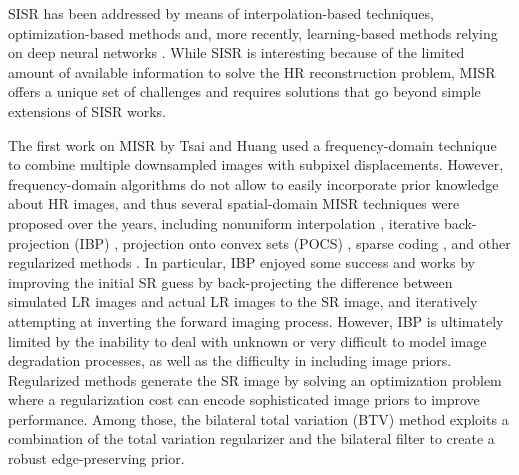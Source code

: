 \documentclass[journal]{IEEEtran}
\begin{document}
SISR has been addressed by means of interpolation-based techniques, optimization-based methods \cite{ng2007total,6414620,6241428,Zhang2013SingleIS} and, more recently, learning-based methods relying on deep neural networks \cite{DnCnnZhang, liu2018non,10.1007/978-3-319-10593-2_13,kim2016deep,kim2015deep_rec,Shi2016RealTimeSI,Lim2017EnhancedDR,Zhang2018ResidualDN}. While SISR is interesting because of the limited amount of available information to solve the HR reconstruction problem, MISR offers a unique set of challenges and requires solutions that go beyond simple extensions of SISR works. 

The first work on MISR by Tsai and Huang \cite{tsaiHuang1984} used a frequency-domain technique to combine multiple downsampled images with subpixel displacements. However, frequency-domain algorithms do not allow to easily incorporate prior knowledge about HR images, and thus several spatial-domain MISR techniques were proposed over the years, including nonuniform interpolation \cite{1176931}, iterative back-projection (IBP) \cite{IRANI1991231}, projection onto convex sets (POCS) \cite{Stark:89,413332}, sparse coding \cite{Kato:2017:DSM:3066426.3066466, KATO201564}, and other regularized methods \cite{1331445,4060955,shen2009}. In particular, IBP \cite{IRANI1991231} enjoyed some success and works by improving the initial SR guess by back-projecting the difference between simulated LR images and actual LR images to the SR image, and iteratively attempting at inverting the forward imaging process. However, IBP is ultimately limited by the inability to deal with unknown or very difficult to model image degradation processes, as well as the difficulty in including image priors. Regularized methods generate the SR image by solving an optimization problem where a regularization cost can encode sophisticated image priors to improve performance. Among those, the bilateral total variation (BTV) method \cite{1331445} exploits a combination of the total variation regularizer and the bilateral filter to create a robust edge-preserving prior.
\end{document}
